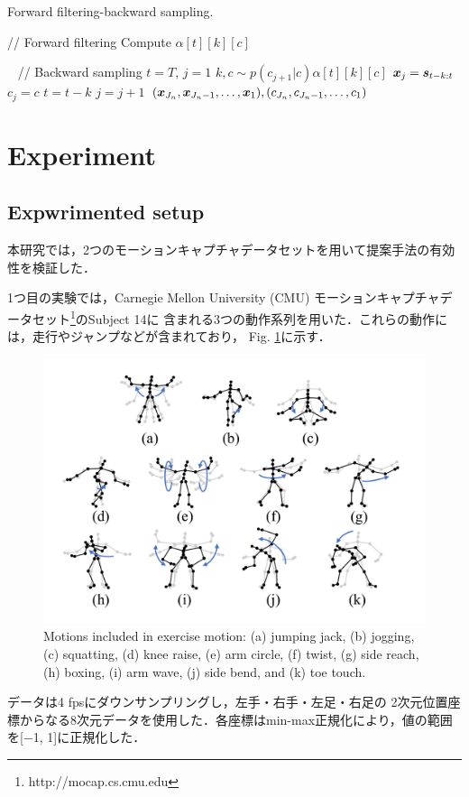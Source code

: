 \documentclass[conference]{IEEEtran}
\begin{document}
\begin{algorithm}[t]
  \footnotesize
  \caption{Forward filtering-backward sampling.}
  \label{alg:ffbs}
  \begin{algorithmic}[1]
  \State // Forward filtering
              \State Compute $\alpha[t][k][c]$
          \EndFor
      \EndFor
  \EndFor
  
  \State ~
  \State // Backward sampling
  \State $t = T$, $j = 1$
      \State $k, c \sim p( c_{j+1} | c ) \alpha[t][k][c]$
      \State ${ \boldsymbol x}_j = { \boldsymbol s}_{t-k:t}$
      \State $c_j = c$
      \State $t = t - k$
      \State $j = j + 1$
  \EndWhile
  \State \Return $({ \boldsymbol x}_{J_n},{ \boldsymbol x}_{J_n-1}, \ldots, { \boldsymbol x}_1), (c_{J_n}, c_{J_n-1}, \ldots, c_1)$
  \end{algorithmic}
  \end{algorithm}  

\section{Experiment}
\subsection{Expwrimented setup}\label{setup}
本研究では，2つのモーションキャプチャデータセットを用いて提案手法の有効性を検証した．

1つ目の実験では，Carnegie Mellon University (CMU) モーションキャプチャデータセット\footnote{http://mocap.cs.cmu.edu}のSubject 14に
含まれる3つの動作系列を用いた．これらの動作には，走行やジャンプなどが含まれており，
Fig. \ref{fig:motion}に示す．
%
\begin{figure}[t]
	\centering
	\includegraphics[scale=0.4]{fig/motion.pdf}
	\caption{Motions included in exercise motion: (a) jumping
jack, (b) jogging, (c) squatting, (d) knee raise, (e) arm circle, (f) twist, (g) side reach, (h) boxing, (i) arm wave, (j) side bend, and (k) toe touch.}
	\label{fig:motion}
	\vspace{-0.4cm}
\end{figure}
%
データは4 fpsにダウンサンプリングし，左手・右手・左足・右足の
2次元位置座標からなる8次元データを使用した．各座標はmin-max正規化により，値の範囲を[−1, 1]に正規化した．
\end{document}
